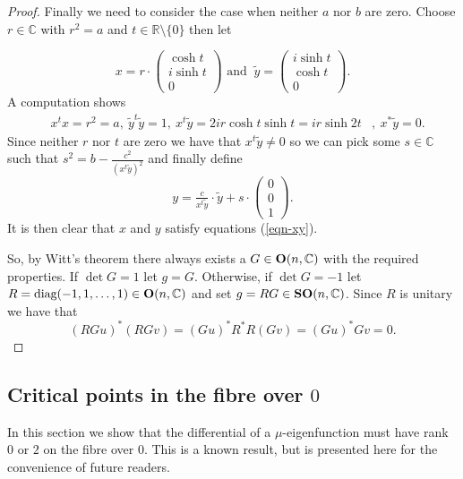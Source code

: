 \documentclass[11pt,reqno]{amsart}
\theoremstyle{plain}
\theoremstyle{definition}
\numberwithin{equation}{section}
\def \rn{{\mathbb R}}
\def \cn{{\mathbb C}}
\def \SOC#1{\text{\bf SO}(#1,\cn)}
\def \OC#1{\text{\bf O}(#1,\cn)}
\numberwithin{equation}{section}
\begin{document}
\begin{proof}
	Finally we need to consider the case when neither $a$ nor $b$ are zero. Choose $r \in \cn$ with $r^2 = a$ and $t \in \rn \setminus \{0\}$ then let 
	
		$$ x = r \cdot \begin{pmatrix}
		\cosh t \\ i \sinh t \\ 0
	\end{pmatrix} \text{ and }  \ \tilde y = \begin{pmatrix}
		i\sinh t\\ \cosh t\\ 0
	\end{pmatrix}.$$ 
	A computation shows
 \begin{eqnarray*}
 	& x^t x = r^2 = a, \  \tilde y^t \tilde y =1, \  x^t \tilde y= 2i r \cosh t \sinh t = i r \sinh 2t&, \ x^* \tilde y=0.
 \end{eqnarray*}
 Since neither $r$ nor $t$ are zero we have that $x^t \tilde y \neq 0$ so we can pick some $s \in \cn$ such that $s^2 = b-\frac{c^2}{(x^t \tilde y)^2}$ and finally define
 $$ y = \tfrac{c}{x^t \tilde y} \cdot \tilde y + s \cdot \begin{pmatrix}
 	0 \\ 0 \\ 1
 \end{pmatrix}.$$
 It is then clear that $x$ and $y$ satisfy equations (\ref{eqn-xy}).
 
 So, by Witt's theorem there always exists a $G \in \OC{n}$ with the required properties. If $\det G =1$ let $g = G$. Otherwise, if $\det G = -1$ let $R = \text{diag}(-1,1,\dots ,1) \in \OC{n}$ and set $g = RG \in \SOC{n}$. Since $R$ is unitary we have that
	$$ (RGu)^*(RGv) = (Gu)^*R^*R(Gv) =(Gu)^*Gv=0.$$

 
\end{proof}


\subsection{Critical points in the fibre over $0$}
In this section we show that the differential of a $\mu$-eigenfunction must have rank $0$ or $2$ on the fibre over $0$. This is a known result, but is presented here for the convenience of future readers.
\end{document}

